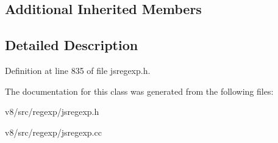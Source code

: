 \subsection*{Additional Inherited Members}


\subsection{Detailed Description}


Definition at line 835 of file jsregexp.\+h.



The documentation for this class was generated from the following files\+:\begin{DoxyCompactItemize}
\item 
v8/src/regexp/jsregexp.\+h\item 
v8/src/regexp/jsregexp.\+cc\end{DoxyCompactItemize}
